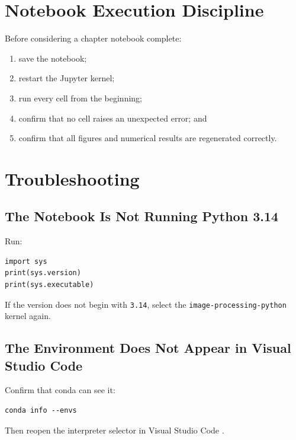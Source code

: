 \section{Notebook Execution Discipline}
\label{sec:notebook-discipline}

Before considering a chapter notebook complete:

\begin{enumerate}
    \item save the notebook;
    \item restart the Jupyter kernel;
    \item run every cell from the beginning;
    \item confirm that no cell raises an unexpected error; and
    \item confirm that all figures and numerical results are
    regenerated correctly.
\end{enumerate}


\section{Troubleshooting}
\label{sec:ch02-troubleshooting}

\subsection{The Notebook Is Not Running Python 3.14}

Run:

\begin{verbatim}
import sys
print(sys.version)
print(sys.executable)
\end{verbatim}

If the version does not begin with \texttt{3.14}, select the
\texttt{image-processing-python} kernel again.

\subsection{The Environment Does Not Appear in Visual Studio Code}

Confirm that conda can see it:

\begin{verbatim}
conda info --envs
\end{verbatim}

Then reopen the interpreter selector in Visual Studio Code
\cite{vscode_python_environments}.

